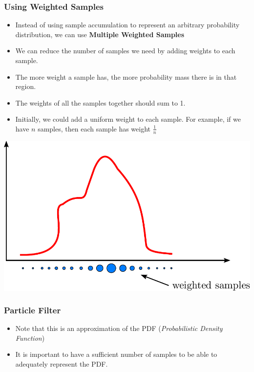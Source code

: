 \begin{frame}
    \frametitle{Using Weighted Samples}
    \footnotesize
    \begin{itemize}
        \item Instead of using sample accumulation to represent an arbitrary probability distribution, we can use \textbf{Multiple Weighted Samples}
        \item We can reduce the number of samples we need by adding weights to each sample.
        \item The more weight a sample has, the more probability mass there is in that region.
        \item The weights of all the samples together should sum to 1.
        \item Initially, we could add a uniform weight to each sample. For example, if we have $n$ samples, then each sample has weight $\frac{1}{n}$
    \end{itemize}
    
    \begin{center}
        \includegraphics[width=0.4\columnwidth]{./images/particle_filter/arbitrary_distribution_weighted_samples.pdf}
    \end{center}
\end{frame}

\begin{frame}
    \frametitle{Particle Filter}
    \footnotesize
    \begin{itemize}
        \item Note that this is an approximation of the PDF (\emph{Probabilistic Density Function})
        \item It is important to have a sufficient number of samples to be able to adequately represent the PDF.
    \end{itemize}
\end{frame}

